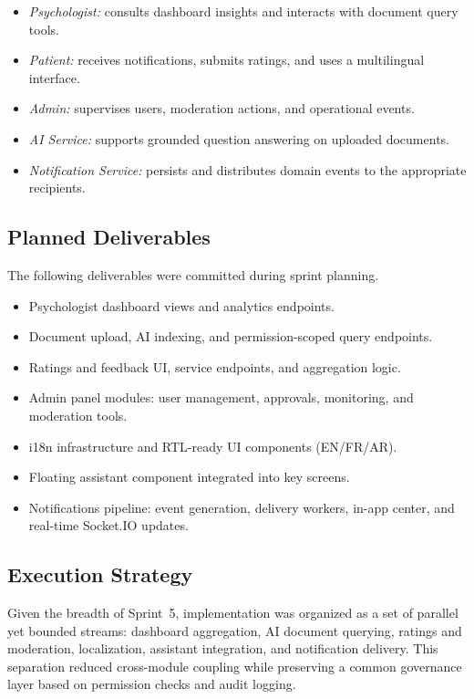 \documentclass[a4paper,12pt]{report}
\begin{document}
\begin{itemize}[leftmargin=*]
  \item[--] \emph{Psychologist:} consults dashboard insights and interacts with document query tools.
  \item[--] \emph{Patient:} receives notifications, submits ratings, and uses a multilingual interface.
  \item[--] \emph{Admin:} supervises users, moderation actions, and operational events.
  \item[--] \emph{AI Service:} supports grounded question answering on uploaded documents.
  \item[--] \emph{Notification Service:} persists and distributes domain events to the appropriate
        recipients.
\end{itemize}

\subsection{Planned Deliverables}

The following deliverables were committed during sprint planning.

\begin{itemize}[leftmargin=*]
  \item[--] Psychologist dashboard views and analytics endpoints.
  \item[--] Document upload, AI indexing, and permission-scoped query endpoints.
  \item[--] Ratings and feedback UI, service endpoints, and aggregation logic.
  \item[--] Admin panel modules: user management, approvals, monitoring, and moderation tools.
  \item[--] i18n infrastructure and RTL-ready UI components (EN/FR/AR).
  \item[--] Floating assistant component integrated into key screens.
  \item[--] Notifications pipeline: event generation, delivery workers, in-app center, and
        real-time Socket.IO updates.
\end{itemize}

\subsection{Execution Strategy}

Given the breadth of Sprint~5, implementation was organized as a set of parallel yet bounded
streams: dashboard aggregation, AI document querying, ratings and moderation, localization,
assistant integration, and notification delivery. This separation reduced cross-module coupling
while preserving a common governance layer based on permission checks and audit logging.
\end{document}
